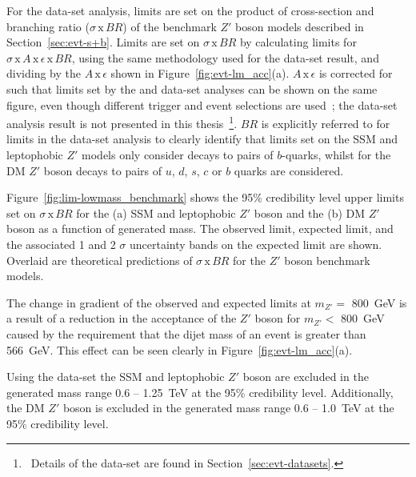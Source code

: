 For the \lm{} data-set analysis, limits are set on the product of cross-section and branching ratio ($\sigma\,\text{x}\,\mathit{BR}$)
of the benchmark $Z'$ boson models described in Section~\ref{sec:evt-s+b}.
Limits are set on $\sigma\,\text{x}\,\mathit{BR}$ by calculating limits for $\sigma\,\text{x}\,\mathit{A}\,\text{x}\,\epsilon\,\text{x}\,\mathit{BR}$,
using the same methodology used for the \summer{} data-set result,
and dividing by the $\mathit{A}\,\text{x}\,\epsilon$ shown in Figure~\ref{fig:evt-lm_acc}(a).
$\mathit{A}\,\text{x}\,\epsilon$ is corrected for such that limits set by the \lm{} and \hm{} data-set analyses can be shown on the same figure,
even though different trigger and event selections are used~\cite{dibjet-full}; the \hm{} data-set analysis result is not presented in this thesis~\footnote{\ Details
  of the \hm{} data-set are found in Section~\ref{sec:evt-datasets}.}.
$\mathit{BR}$ is explicitly referred to for limits in the \lm{} data-set analysis to clearly identify that
limits set on the SSM and leptophobic $Z'$ models only consider decays to pairs of $b$-quarks,
whilst for the DM $Z'$ boson decays to pairs of $u$, $d$, $s$, $c$ or $b$ quarks are considered.

Figure~\ref{fig:lim-lowmass_benchmark} shows the
95\% credibility level upper limits set on $\sigma\,\text{x}\,\mathit{BR}$
for the (a) SSM and leptophobic $Z'$ boson
and the (b)  DM $Z'$ boson as a function of generated mass.
The observed limit, expected limit, and the associated 1 and 2 $\sigma$ uncertainty bands on the expected limit are shown.
Overlaid are theoretical predictions of $\sigma\,\text{x}\,\mathit{BR}$ for the
$Z'$ boson benchmark models.

The change in gradient of the observed and expected limits at $m_{Z'} =$ 800~GeV
is a result of a reduction in the acceptance of the $Z'$ boson for $m_{Z'} <$ 800~GeV
caused by the requirement that the dijet mass of an event is greater than 566~GeV.
This effect can be seen clearly in Figure~\ref{fig:evt-lm_acc}(a).

Using the \lm{} data-set the SSM and leptophobic $Z'$ boson are
excluded in the generated mass range 0.6 -- 1.25~TeV at the 95\% credibility level.
Additionally, the DM $Z'$ boson is excluded in the generated mass range
0.6 -- 1.0~TeV  at the 95\% credibility level.

